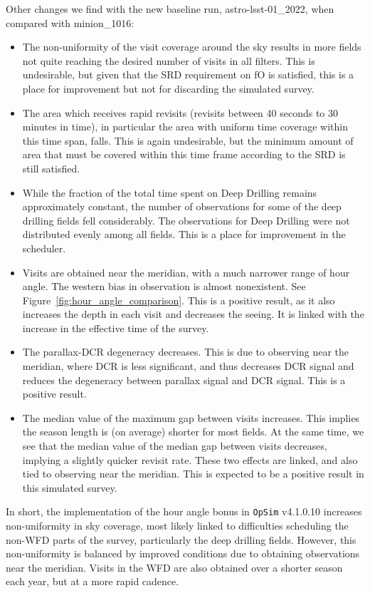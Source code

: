\documentclass[DM,authoryear,toc]{lsstdoc}
\newcommand{\opsim}{\texttt{OpSim}\xspace}
\begin{document}
Other changes we find with the new baseline run, astro-lsst-01\_2022, when compared with minion\_1016:
\begin{itemize}
\item The non-uniformity of the visit coverage around the sky results in more fields not quite reaching the desired number of visits in all filters. This is undesirable, but given that the SRD requirement on fO is satisfied, this is a place for improvement but not for discarding the simulated survey.
\item The area which receives rapid revisits (revisits between 40 seconds to 30 minutes in time), in particular the area with uniform time coverage within this time span, falls. This is again undesirable, but the minimum amount of area that must be covered within this time frame according to the SRD is still satisfied. 
\item While the fraction of the total time spent on Deep Drilling remains approximately constant, the number of observations for some of the deep drilling fields fell considerably. The observations for Deep Drilling were not distributed evenly among all fields. This is a place for improvement in the scheduler.
\item Visits are obtained near the meridian, with a much narrower range of hour angle. The western bias in observation is almost nonexistent. See Figure~\ref{fig:hour_angle_comparison}.  This is a positive result, as it also increases the depth in each visit and decreases the seeing. It is linked with the increase in the effective time of the survey.
\item The parallax-DCR degeneracy decreases. This is due to observing near the meridian, where DCR is less significant, and thus decreases DCR signal and reduces the degeneracy between parallax signal and DCR signal. This is a positive result.
\item The median value of the maximum gap between visits increases. This implies the season length is (on average) shorter for most fields. At the same time, we see that the median value of the median gap between visits decreases, implying a slightly quicker revisit rate. These two effects are linked, and also tied to observing near the meridian. This is expected to be a positive result in this simulated survey.
\end{itemize}
In short, the implementation of the hour angle bonus in \opsim v4.1.0.10 increases non-uniformity in sky coverage, most likely linked to difficulties scheduling the non-WFD parts of the survey, particularly the deep drilling fields. However, this non-uniformity is balanced by improved conditions due to obtaining observations near the meridian. Visits in the WFD are also obtained over a shorter season each year, but at a more rapid cadence.
\end{document}
